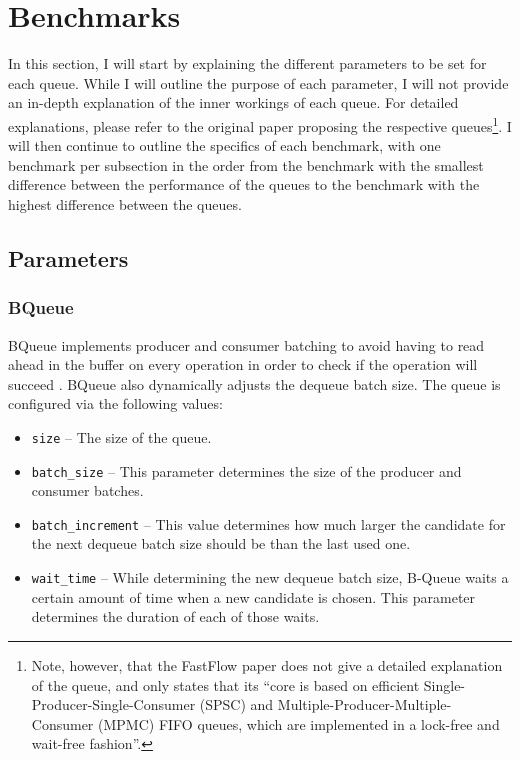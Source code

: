 \section{Benchmarks}
In this section, I will start by explaining the different parameters to be set for each queue.
While I will outline the purpose of each parameter, I will not provide an in-depth explanation of the inner
workings of each queue.
For detailed explanations, please refer to the original paper proposing the respective queues\footnote{Note,
    however, that the FastFlow paper does not give a detailed explanation of the queue, and only states that its
    ``core is based on efficient Single-Producer-Single-Consumer (SPSC) and Multiple-Producer-Multiple-Consumer
(MPMC) FIFO queues, which are implemented in a lock-free and wait-free fashion''\cite{FastFlow}.}.
I will then continue to outline the specifics of each benchmark, with one benchmark per subsection in the
order from the benchmark with the smallest difference between the performance of the queues to the benchmark
with the highest difference between the queues.

\subsection{Parameters}
\subsubsection*{BQueue}
BQueue implements producer and consumer batching to avoid having to read ahead in the buffer on every
operation in order to check if the operation will succeed \cite{B-Queue}.
BQueue also dynamically adjusts the dequeue batch size.
The queue is configured via the following values:
\begin{itemize}
    \item \texttt{size} -- The size of the queue.
    \item \texttt{batch\_size} -- This parameter determines the size of the producer and consumer batches.
    \item \texttt{batch\_increment} -- This value determines how much larger the candidate for the next
        dequeue batch size should be than the last used one.
    \item \texttt{wait\_time} -- While determining the new dequeue batch size, B-Queue waits a certain amount
        of time when a new candidate is chosen. This parameter determines the duration of each of those waits.
\end{itemize}

